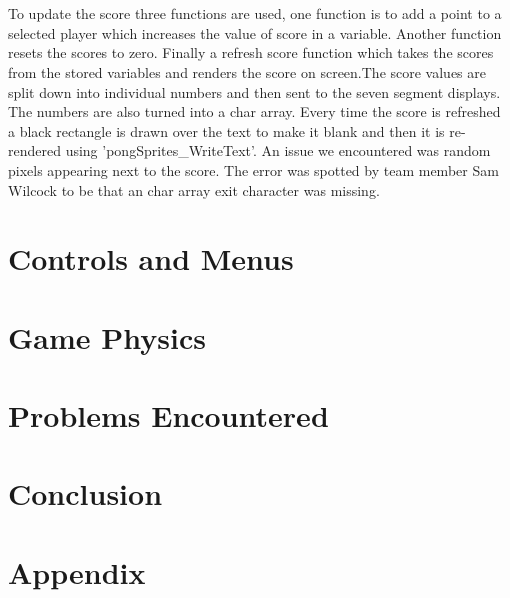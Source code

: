 \documentclass[a4paper,12pt]{article}
\begin{document}
\begin{flushleft}
\\ \- \\
To update the score three functions are used, one function is to add a point to a selected player which increases the value of score in a variable. Another function resets the scores to zero. Finally a refresh score function which takes the scores from the stored variables and renders the score on screen.The score values are split down into individual numbers and then sent to the seven segment displays. The numbers are also turned into a char array. Every time the score is refreshed a black rectangle is drawn over the text to make it blank and then it is re-rendered using 'pongSprites\_WriteText'. An issue we encountered was random pixels appearing next to the score. The error was spotted by team member Sam Wilcock to be that an char array exit character was missing.
\end{flushleft}
\newpage
\section{Controls and Menus}
\newpage
\section{Game Physics}
\newpage
\section{Problems Encountered}
\newpage
\section{Conclusion}
\begin{flushleft}

\end{flushleft}
\newpage
\section{Appendix}
\newpage
{}
\begin{flushleft}

\end{flushleft}
\end{document}
